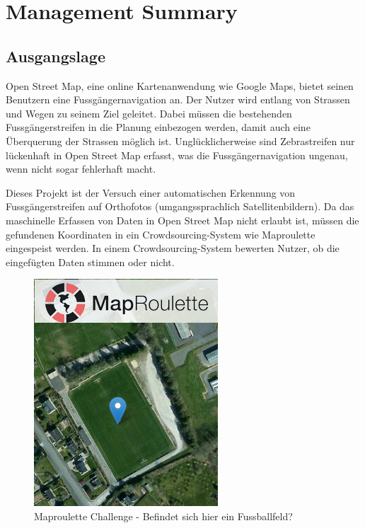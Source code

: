 \section{Management Summary}
\subsection*{Ausgangslage}
Open Street Map, eine online Kartenanwendung wie Google Maps, bietet seinen Benutzern eine Fussgängernavigation an. Der Nutzer wird entlang von Strassen und Wegen zu seinem Ziel geleitet. Dabei müssen die bestehenden Fussgängerstreifen in die Planung einbezogen werden, damit auch eine Überquerung der Strassen möglich ist. Unglücklicherweise sind Zebrastreifen nur lückenhaft in Open Street Map erfasst, was die Fussgängernavigation ungenau, wenn nicht sogar fehlerhaft macht.

Dieses Projekt ist der Versuch einer automatischen Erkennung von Fussgängerstreifen auf Orthofotos (umgangssprachlich Satellitenbildern). Da das maschinelle Erfassen von Daten in Open Street Map nicht erlaubt ist, müssen die gefundenen Koordinaten in ein Crowdsourcing-System wie Maproulette eingespeist werden. In einem Crowdsourcing-System bewerten Nutzer, ob die eingefügten Daten stimmen oder nicht.
\begin{figure}[H]
	\centering
	\includegraphics[]{images/Maproulette_management_summary.png}
	\caption[Management Summery Maproulette]{Maproulette Challenge - Befindet sich hier ein Fussballfeld?}
\end{figure}


